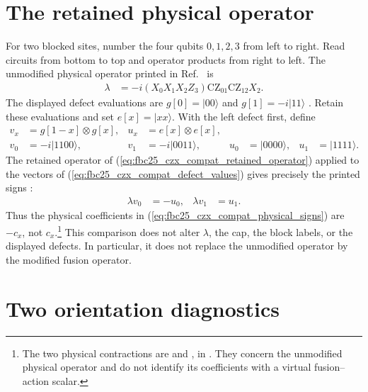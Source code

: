 \documentclass{article}
\begin{document}
\section{The retained physical operator}

For two blocked sites, number the four qubits $0,1,2,3$ from left to right. Read circuits from bottom to top and operator products from right to left. The unmodified physical operator printed in
Ref.~\cite[lines~4989--5013]{FrancoRubio2025MPUGauging} is
\begin{align}
    \lambda & =-i(X_0X_1X_2Z_3) \mathrm{CZ}_{01}\mathrm{CZ}_{12}X_2.
    \label{eq:fbc25_czx_compat_retained_operator}
\end{align}
The displayed defect evaluations are $g[0]=|00\rangle$ and $g[1]=-i|11\rangle$
\cite[lines~4800--4859]{FrancoRubio2025MPUGauging}. Retain these evaluations and set $e[x]=|xx\rangle$. With the left defect first, define
\begin{align}
    v_x & =g[1-x]\otimes g[x], & u_x            & =e[x]\otimes e[x],
    \label{eq:fbc25_czx_compat_defect_pairs}                                                   \\
    v_0 & =-i|1100\rangle,     & v_1            & =-i|0011\rangle,
        & u_0                  & =|0000\rangle, & u_1                & =|1111\rangle.
    \label{eq:fbc25_czx_compat_defect_values}
\end{align}
The retained operator of
(\ref{eq:fbc25_czx_compat_retained_operator}) applied to the vectors of
(\ref{eq:fbc25_czx_compat_defect_values}) gives precisely the printed signs
\cite[lines~5014--5067]{FrancoRubio2025MPUGauging}:
\begin{align}
    \lambda v_0 & =-u_0, & \lambda v_1 & =u_1.
    \label{eq:fbc25_czx_compat_physical_signs}
\end{align}
Thus the physical coefficients in
(\ref{eq:fbc25_czx_compat_physical_signs}) are $-c_x$, not $c_x$.\footnote{The two physical contractions are
     and
    , in
    . They concern the unmodified physical operator and do not identify its coefficients with a virtual fusion--action scalar.} This comparison does not alter $\lambda$, the cap, the block labels, or the displayed defects. In particular, it does not replace the unmodified operator by the modified fusion operator.

\section{Two orientation diagnostics}
\end{document}
